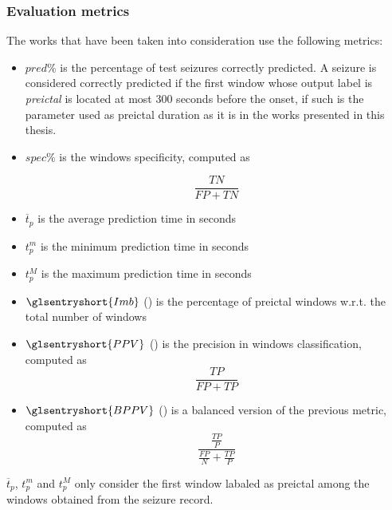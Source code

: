 \subsubsection{Evaluation metrics} \label{subsub:evaluation-metrics}

The works that have been taken into consideration use the following metrics:

\begin{itemize}
    \item $pred\%$ is the percentage of test seizures correctly predicted. A seizure is considered correctly predicted if the first window whose output label is \textit{preictal} is located at most 300 seconds before the onset, if such is the parameter used as preictal duration as it is in the works presented in this thesis.
    \item $spec\%$ is the windows specificity, computed as
    
        \begin{equation}
            \frac{TN}{FP+TN}
        \end{equation}
        
    \item $\overline{t}_p$ is the average prediction time in seconds
    \item $t_p^m$ is the minimum prediction time in seconds
    \item $t_p^M$ is the maximum prediction time in seconds
    \item $\glsentryshort{Imb}$ () is the percentage of preictal windows w.r.t. the total number of windows
    \item $\glsentryshort{PPV}$ () is the precision in windows classification, computed as
        \begin{equation}
            \frac{TP}{FP+TP}
        \end{equation}

    \item $\glsentryshort{BPPV}$ () is a balanced version of the previous metric, computed as
        \begin{equation}
            \frac{\frac{TP}{P}}{\frac{FP}{N}+\frac{TP}{P}}
        \end{equation}
\end{itemize}

$\overline{t}_p$, $t_p^m$ and $t_p^M$ only consider the first window labaled as preictal among the windows obtained from the seizure record.

